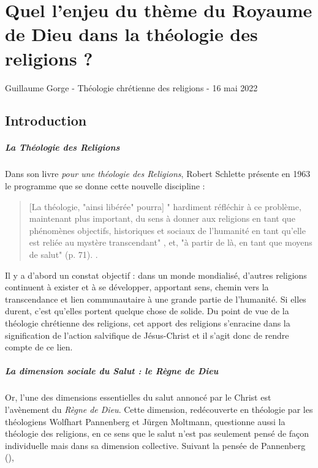 

\chapter{Quel l’enjeu du thème du Royaume de Dieu dans la théologie des religions ? }

Guillaume Gorge - Théologie chrétienne des religions - 16 mai 2022

\section{Introduction}

\paragraph{La Théologie des Religions}
Dans son livre \textit{pour une théologie des Religions}, Robert Schlette présente en 1963 le programme que se donne cette nouvelle discipline : 
\begin{quote}
   [La théologie, "ainsi libérée"
pourra] "{ hardiment réfléchir à ce problème, maintenant plus important,
du sens à donner aux religions en tant que phénomènes objectifs, historiques
et sociaux de l'humanité en tant qu'elle est reliée au mystère transcendant}" ,
et,  "{à partir de là, en tant que moyens de salut" (p. 71). } .
\end{quote}

Il y a d'abord un constat objectif : dans un monde mondialisé, d'autres religions continuent à exister et à se développer, apportant sens, chemin vers la transcendance et lien communautaire à une grande partie de l'humanité. Si elles durent, c'est qu'elles portent quelque chose de solide. 
Du point de vue de la théologie chrétienne des religions, cet apport des religions s'enracine dans la signification de l'action salvifique de Jésus-Christ et il s'agit donc de rendre compte de ce lien.


\paragraph{La dimension sociale du Salut : \textit{le Règne de Dieu}} Or, l'une des dimensions essentielles du salut annoncé par le Christ est l'avènement du \textit{Règne de Dieu}. Cette dimension, redécouverte en théologie par les théologiens Wolfhart Pannenberg et Jürgen Moltmann, questionne aussi la théologie des religions, en ce sens que le salut n'est pas seulement pensé de façon individuelle mais dans sa dimension collective. Suivant la pensée de Pannenberg (\cite{Pannenberg:RoyaumeDieu}), 


